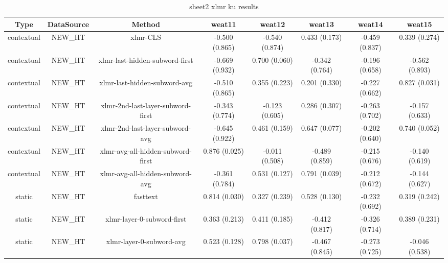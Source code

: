 \begin{sidewaystable}[htb]
    \centering
    \caption{sheet2 xlmr ku results}
    \label{appendix_tab:sheet2_xlmr_ku_results}
    \small
    \begin{tabular}{@{}cccccccc@{}}
        \toprule
        Type & DataSource & Method & weat11 & weat12 & weat13 & weat14 & weat15 \\
        \midrule
        contextual & NEW\_HT & xlmr-CLS & -0.500 (0.865) & -0.540 (0.874) & 0.433 (0.173) & -0.459 (0.837) & 0.339 (0.274) \\
        contextual & NEW\_HT & xlmr-last-hidden-subword-first & -0.669 (0.932) & 0.700 (0.060) & -0.342 (0.764) & -0.196 (0.658) & -0.562 (0.893) \\
        contextual & NEW\_HT & xlmr-last-hidden-subword-avg & -0.510 (0.865) & 0.355 (0.223) & 0.201 (0.330) & -0.227 (0.662) & 0.827 (0.031) \\
        contextual & NEW\_HT & xlmr-2nd-last-layer-subword-first & -0.343 (0.774) & -0.123 (0.605) & 0.286 (0.307) & -0.263 (0.702) & -0.157 (0.633) \\
        contextual & NEW\_HT & xlmr-2nd-last-layer-subword-avg & -0.645 (0.922) & 0.461 (0.159) & 0.647 (0.077) & -0.202 (0.640) & 0.740 (0.052) \\
        contextual & NEW\_HT & xlmr-avg-all-hidden-subword-first & 0.876 (0.025) & -0.011 (0.508) & -0.489 (0.859) & -0.215 (0.676) & -0.140 (0.619) \\
        contextual & NEW\_HT & xlmr-avg-all-hidden-subword-avg & -0.361 (0.784) & 0.531 (0.127) & 0.791 (0.039) & -0.212 (0.672) & -0.144 (0.627) \\
        static & NEW\_HT & fasttext & 0.814 (0.030) & 0.327 (0.239) & 0.528 (0.130) & -0.232 (0.692) & 0.319 (0.242) \\
        static & NEW\_HT & xlmr-layer-0-subword-first & 0.363 (0.213) & 0.411 (0.185) & -0.412 (0.817) & -0.326 (0.714) & 0.389 (0.231) \\
        static & NEW\_HT & xlmr-layer-0-subword-avg & 0.523 (0.128) & 0.798 (0.037) & -0.467 (0.845) & -0.273 (0.725) & -0.046 (0.538) \\
        \bottomrule
    \end{tabular}
\end{sidewaystable}